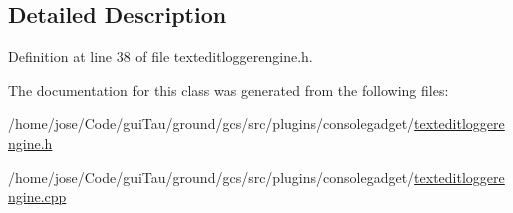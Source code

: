 \subsection{Detailed Description}


Definition at line 38 of file texteditloggerengine.\-h.



The documentation for this class was generated from the following files\-:\begin{DoxyCompactItemize}
\item 
/home/jose/\-Code/gui\-Tau/ground/gcs/src/plugins/consolegadget/\hyperlink{texteditloggerengine_8h}{texteditloggerengine.\-h}\item 
/home/jose/\-Code/gui\-Tau/ground/gcs/src/plugins/consolegadget/\hyperlink{texteditloggerengine_8cpp}{texteditloggerengine.\-cpp}\end{DoxyCompactItemize}
